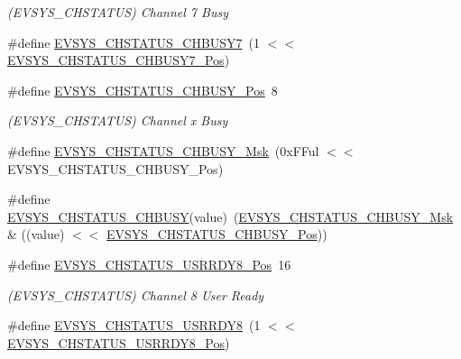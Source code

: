 \begin{DoxyCompactItemize}
\begin{DoxyCompactList}\small\item\em (E\+V\+S\+Y\+S\+\_\+\+C\+H\+S\+T\+A\+T\+US) Channel 7 Busy \end{DoxyCompactList}\item 
\#define \mbox{\hyperlink{group___s_a_m_d21___e_v_s_y_s_gaec9c768e83d872b7df72557d7491f015}{E\+V\+S\+Y\+S\+\_\+\+C\+H\+S\+T\+A\+T\+U\+S\+\_\+\+C\+H\+B\+U\+S\+Y7}}~(1 $<$$<$ \mbox{\hyperlink{group___s_a_m_d21___e_v_s_y_s_gadd160959cc215f9816343ce458e9c828}{E\+V\+S\+Y\+S\+\_\+\+C\+H\+S\+T\+A\+T\+U\+S\+\_\+\+C\+H\+B\+U\+S\+Y7\+\_\+\+Pos}})
\item 
\#define \mbox{\hyperlink{group___s_a_m_d21___e_v_s_y_s_gaf934c39253522ee2b09adf3b8a61ab8b}{E\+V\+S\+Y\+S\+\_\+\+C\+H\+S\+T\+A\+T\+U\+S\+\_\+\+C\+H\+B\+U\+S\+Y\+\_\+\+Pos}}~8
\begin{DoxyCompactList}\small\item\em (E\+V\+S\+Y\+S\+\_\+\+C\+H\+S\+T\+A\+T\+US) Channel x Busy \end{DoxyCompactList}\item 
\#define \mbox{\hyperlink{group___s_a_m_d21___e_v_s_y_s_ga7bce985535fe381445bb8a5cf1f2399b}{E\+V\+S\+Y\+S\+\_\+\+C\+H\+S\+T\+A\+T\+U\+S\+\_\+\+C\+H\+B\+U\+S\+Y\+\_\+\+Msk}}~(0x\+F\+Ful $<$$<$ E\+V\+S\+Y\+S\+\_\+\+C\+H\+S\+T\+A\+T\+U\+S\+\_\+\+C\+H\+B\+U\+S\+Y\+\_\+\+Pos)
\item 
\#define \mbox{\hyperlink{group___s_a_m_d21___e_v_s_y_s_ga1ec9f87254248d2d1b4e567644d57c7f}{E\+V\+S\+Y\+S\+\_\+\+C\+H\+S\+T\+A\+T\+U\+S\+\_\+\+C\+H\+B\+U\+SY}}(value)~(\mbox{\hyperlink{group___s_a_m_d21___e_v_s_y_s_ga7bce985535fe381445bb8a5cf1f2399b}{E\+V\+S\+Y\+S\+\_\+\+C\+H\+S\+T\+A\+T\+U\+S\+\_\+\+C\+H\+B\+U\+S\+Y\+\_\+\+Msk}} \& ((value) $<$$<$ \mbox{\hyperlink{group___s_a_m_d21___e_v_s_y_s_gaf934c39253522ee2b09adf3b8a61ab8b}{E\+V\+S\+Y\+S\+\_\+\+C\+H\+S\+T\+A\+T\+U\+S\+\_\+\+C\+H\+B\+U\+S\+Y\+\_\+\+Pos}}))
\item 
\#define \mbox{\hyperlink{group___s_a_m_d21___e_v_s_y_s_gaa405e16558d697c39b0af7b20b416ce9}{E\+V\+S\+Y\+S\+\_\+\+C\+H\+S\+T\+A\+T\+U\+S\+\_\+\+U\+S\+R\+R\+D\+Y8\+\_\+\+Pos}}~16
\begin{DoxyCompactList}\small\item\em (E\+V\+S\+Y\+S\+\_\+\+C\+H\+S\+T\+A\+T\+US) Channel 8 User Ready \end{DoxyCompactList}\item 
\#define \mbox{\hyperlink{group___s_a_m_d21___e_v_s_y_s_gadd9629d41bab576ff87abf6123f66639}{E\+V\+S\+Y\+S\+\_\+\+C\+H\+S\+T\+A\+T\+U\+S\+\_\+\+U\+S\+R\+R\+D\+Y8}}~(1 $<$$<$ \mbox{\hyperlink{group___s_a_m_d21___e_v_s_y_s_gaa405e16558d697c39b0af7b20b416ce9}{E\+V\+S\+Y\+S\+\_\+\+C\+H\+S\+T\+A\+T\+U\+S\+\_\+\+U\+S\+R\+R\+D\+Y8\+\_\+\+Pos}})

\end{DoxyCompactItemize}
